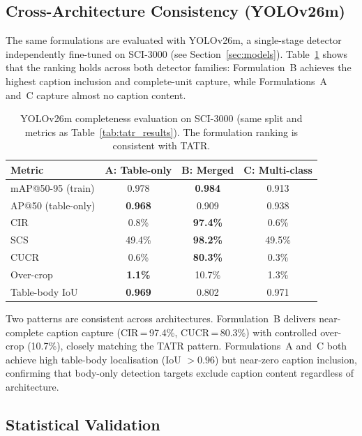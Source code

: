 \documentclass[pdflatex,sn-mathphys-num,iicol]{sn-jnl}
\begin{document}
\subsection{Cross-Architecture Consistency (YOLOv26m)}\label{sec:yolo_results}

The same formulations are evaluated with YOLOv26m, a single-stage detector
independently fine-tuned on SCI-3000 (see Section~\ref{sec:models}).
Table~\ref{tab:yolo_results} shows that the ranking holds across both detector
families: Formulation~B achieves the highest caption inclusion and complete-unit
capture, while Formulations~A and~C capture almost no caption content.

\begin{table}[ht!]
\caption{YOLOv26m completeness evaluation on SCI-3000
(same split and metrics as Table~\ref{tab:tatr_results}). The formulation
ranking is consistent with TATR.}
\label{tab:yolo_results}
\footnotesize\setlength{\tabcolsep}{3pt}
\begin{tabular}{@{}lccc@{}}
\toprule
\textbf{Metric} & \textbf{A: Table-only} & \textbf{B: Merged} & \textbf{C: Multi-class} \\
\midrule
mAP@50-95 (train) & 0.978 & \textbf{0.984} & 0.913 \\
AP@50 (table-only) & \textbf{0.968} & 0.909 & 0.938 \\
\midrule
CIR & 0.8\% & \textbf{97.4\%} & 0.6\% \\
SCS & 49.4\% & \textbf{98.2\%} & 49.5\% \\
CUCR & 0.6\% & \textbf{80.3\%} & 0.3\% \\
Over-crop & \textbf{1.1\%} & 10.7\% & 1.3\% \\
\midrule
Table-body IoU & \textbf{0.969} & 0.802 & 0.971 \\
\bottomrule
\end{tabular}
\end{table}

Two patterns are consistent across architectures. Formulation~B delivers
near-complete caption capture (CIR\,=\,97.4\%, CUCR\,=\,80.3\%) with controlled
over-crop (10.7\%), closely matching the TATR pattern. Formulations~A and~C both
achieve high table-body localisation (IoU $> 0.96$) but near-zero caption inclusion,
confirming that body-only detection targets exclude caption content regardless of
architecture.

\subsection{Statistical Validation}\label{sec:bootstrap}
\end{document}
